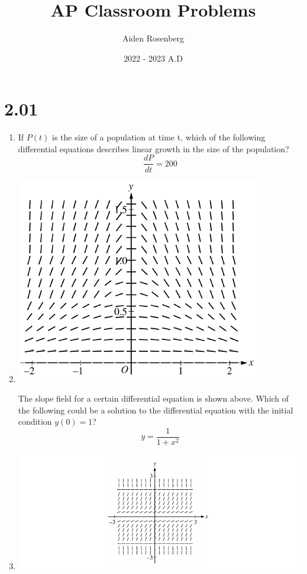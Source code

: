 \documentclass[12pt]{article}
\title{AP Classroom Problems}
\author{Aiden Rosenberg}
\date{2022 - 2023 A.D}
\begin{document}
\maketitle
\section*{2.01}
\begin{enumerate}
    \item If $P(t)$ is the size of a population at time t, which of the following differential equations describes linear growth in the size of the population?
   $$ \boxed{\frac{dP}{dt}=200}$$
    \item 
   
    \begin{center}
        \includegraphics[scale=0.75]{original.png}
    \end{center}
    The slope field for a certain differential equation is shown above. Which of the following could be a solution to the differential equation with the initial condition $y(0)=1$?
    $$\boxed{y=\frac{1}{1+x^2}}$$
    \item 
     \begin{center}
        \includegraphics[scale=1]{original-1.png}

\end{center}
\end{enumerate}
\end{document}
